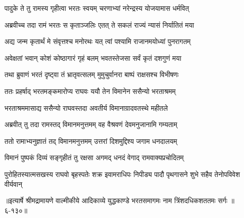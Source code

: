 \twolineshloka
{पादुके ते तु रामस्य गृहीत्वा भरतः स्वयम्}
{चरणाभ्यां नरेन्द्रस्य योजयामास धर्मवित्} %

\twolineshloka
{अब्रवीच्च तदा रामं भरतः स कृताञ्जलिः}
{एतत् ते सकलं राज्यं न्यासं निर्यातितं मया} %

\twolineshloka
{अद्य जन्म कृतार्थं मे संवृत्तश्च मनोरथः}
{यत् त्वां पश्यामि राजानमयोध्यां पुनरागतम्} %

\twolineshloka
{अवेक्षतां भवान् कोशं कोष्ठागारं गृहं बलम्}
{भवतस्तेजसा सर्वं कृतं दशगुणं मया} %

\twolineshloka
{तथा ब्रुवाणं भरतं दृष्ट्वा तं भ्रातृवत्सलम्}
{मुमुचुर्वानरा बाष्पं राक्षसश्च विभीषणः} %

\twolineshloka
{ततः प्रहर्षाद् भरतमङ्कमारोप्य राघवः}
{ययौ तेन विमानेन ससैन्यो भरताश्रमम्} %

\twolineshloka
{भरताश्रममासाद्य ससैन्यो राघवस्तदा}
{अवतीर्य विमानाग्रादवतस्थे महीतले} %

\twolineshloka
{अब्रवीत् तु तदा रामस्तद् विमानमनुत्तमम्}
{वह वैश्रवणं देवमनुजानामि गम्यताम्} %

\twolineshloka
{ततो रामाभ्यनुज्ञातं तद् विमानमनुत्तमम्}
{उत्तरां दिशमुद्दिश्य जगाम धनदालयम्} %

\twolineshloka
{विमानं पुष्पकं दिव्यं सङ्गृहीतं तु रक्षसा}
{अगमद् धनदं वेगाद् रामवाक्यप्रचोदितम्} %

\twolineshloka
{पुरोहितस्यात्मसखस्य राघवो बृहस्पतेः शक्र इवामराधिपः}
{निपीड्य पादौ पृथगासने शुभे सहैव तेनोपविवेश वीर्यवान्} %


॥इत्यार्षे श्रीमद्रामायणे वाल्मीकीये आदिकाव्ये युद्धकाण्डे भरतसमागमः नाम त्रिंशदधिकशततमः सर्गः ॥६-१३०॥
